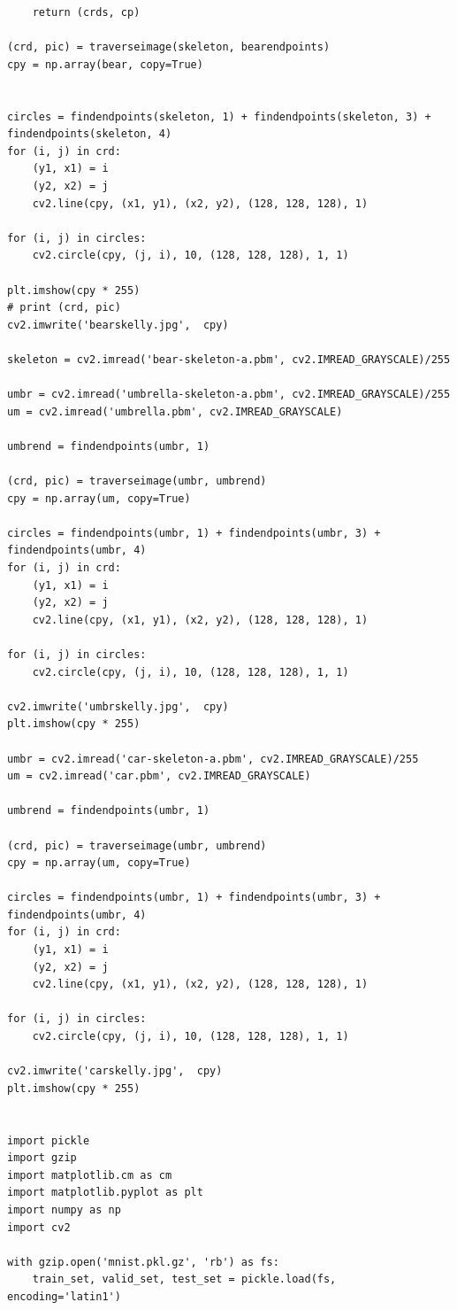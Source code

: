 \documentclass{article}
\begin{document}
\begin{verbatim}
    return (crds, cp)

(crd, pic) = traverseimage(skeleton, bearendpoints)
cpy = np.array(bear, copy=True)


circles = findendpoints(skeleton, 1) + findendpoints(skeleton, 3) + findendpoints(skeleton, 4)
for (i, j) in crd:
    (y1, x1) = i
    (y2, x2) = j
    cv2.line(cpy, (x1, y1), (x2, y2), (128, 128, 128), 1)
    
for (i, j) in circles:
    cv2.circle(cpy, (j, i), 10, (128, 128, 128), 1, 1)
    
plt.imshow(cpy * 255)
# print (crd, pic)
cv2.imwrite('bearskelly.jpg',  cpy)

skeleton = cv2.imread('bear-skeleton-a.pbm', cv2.IMREAD_GRAYSCALE)/255
    
umbr = cv2.imread('umbrella-skeleton-a.pbm', cv2.IMREAD_GRAYSCALE)/255
um = cv2.imread('umbrella.pbm', cv2.IMREAD_GRAYSCALE)

umbrend = findendpoints(umbr, 1)

(crd, pic) = traverseimage(umbr, umbrend)
cpy = np.array(um, copy=True)

circles = findendpoints(umbr, 1) + findendpoints(umbr, 3) + findendpoints(umbr, 4)
for (i, j) in crd:
    (y1, x1) = i
    (y2, x2) = j
    cv2.line(cpy, (x1, y1), (x2, y2), (128, 128, 128), 1)
    
for (i, j) in circles:
    cv2.circle(cpy, (j, i), 10, (128, 128, 128), 1, 1)

cv2.imwrite('umbrskelly.jpg',  cpy)
plt.imshow(cpy * 255)
   
umbr = cv2.imread('car-skeleton-a.pbm', cv2.IMREAD_GRAYSCALE)/255
um = cv2.imread('car.pbm', cv2.IMREAD_GRAYSCALE)

umbrend = findendpoints(umbr, 1)

(crd, pic) = traverseimage(umbr, umbrend)
cpy = np.array(um, copy=True)

circles = findendpoints(umbr, 1) + findendpoints(umbr, 3) + findendpoints(umbr, 4)
for (i, j) in crd:
    (y1, x1) = i
    (y2, x2) = j
    cv2.line(cpy, (x1, y1), (x2, y2), (128, 128, 128), 1)
    
for (i, j) in circles:
    cv2.circle(cpy, (j, i), 10, (128, 128, 128), 1, 1)

cv2.imwrite('carskelly.jpg',  cpy)
plt.imshow(cpy * 255)


import pickle
import gzip
import matplotlib.cm as cm
import matplotlib.pyplot as plt
import numpy as np
import cv2

with gzip.open('mnist.pkl.gz', 'rb') as fs:
    train_set, valid_set, test_set = pickle.load(fs, encoding='latin1')


\end{verbatim}
\end{document}
